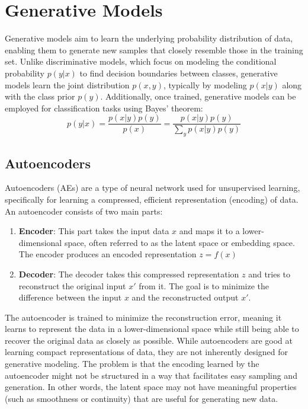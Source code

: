 \section{Generative Models}
Generative models aim to learn the underlying probability distribution of data, enabling them to generate 
new samples that closely resemble those in the training set. Unlike discriminative models, which focus on 
modeling the conditional probability $p(y|x)$ to find decision boundaries between classes,  generative models
learn the joint distribution $p(x,y)$, typically by modeling $p(x|y)$  along with the class prior $p(y)$.
Additionally, once trained, generative models can be employed for classification tasks using Bayes' theorem:
$$p(y|x) = \frac{p(x|y)p(y)}{p(x)} = \frac{p(x|y)p(y)}{\sum_{y}p(x|y)p(y)} $$

\subsection{Autoencoders}
Autoencoders (AEs) are a type of neural network used for unsupervised learning, specifically for learning a compressed, 
efficient representation (encoding) of data. An autoencoder consists of two main parts:

\begin{enumerate}
    \item \textbf{Encoder}: This part takes the input data $x$ and maps it to a lower-
    dimensional space, often referred to as the latent space or embedding space. The 
    encoder produces an encoded representation $z = f(x)$
    
    \item \textbf{Decoder}: The decoder takes this compressed representation $z$ and tries 
    to reconstruct the original input $x'$ from it. The goal is to minimize the difference 
    between the input $x$ and the reconstructed output $x'$.
\end{enumerate}

The autoencoder is trained to minimize the reconstruction error, meaning it learns to 
represent the data in a lower-dimensional space while still being able to recover the 
original data as closely as possible.\newline 
While autoencoders are good at learning compact representations of data, they are not 
inherently designed for generative modeling. The problem is that the encoding learned by 
the autoencoder might not be structured in a way that facilitates easy sampling and 
generation. In other words, the latent space may not have meaningful properties (such as 
smoothness or continuity) that are useful for generating new data.

